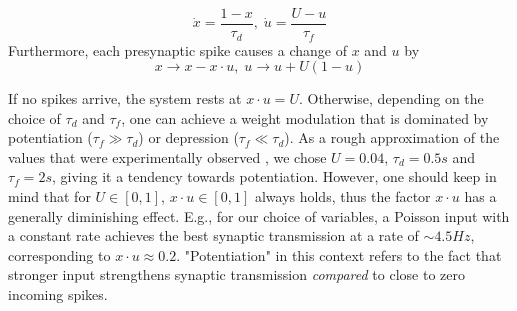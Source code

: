 \documentclass[10pt,a4paper]{article}
\begin{document}
\begin{equation}
\dot{x} = \frac{1-x}{\tau_d},\; \dot{u} = \frac{U-u}{\tau_f}
\label{STP_dynamics1}
\end{equation}
Furthermore, each presynaptic spike causes a change of $x$ and $u$ by
\begin{equation}
x \rightarrow x - x\cdot u,\; u \rightarrow u + U(1-u)
\label{STP_dynamics2}
\end{equation}

If no spikes arrive, the system rests at $x\cdot u = U$. Otherwise, depending on the choice of $\tau_d$ and $\tau_f$, one can achieve a weight modulation that is dominated by potentiation ($\tau_f \gg \tau_d$) or depression ($\tau_f \ll \tau_d$). As a rough approximation of the values that were experimentally observed \cite{Markram_STP}, we chose $U=0.04$, $\tau_d = 0.5s$ and $\tau_f = 2s$, giving it a tendency towards potentiation. However, one should keep in mind that for $U\in [0,1]$, $x\cdot u \in [0,1]$ always holds, thus the factor $x\cdot u$ has a generally diminishing effect. E.g., for our choice of variables, a Poisson input with a constant rate achieves the best synaptic transmission at a rate of $\sim 4.5 Hz$, corresponding to $x\cdot u \approx 0.2$. "Potentiation" in this context refers to the fact that stronger input strengthens synaptic transmission \emph{compared} to close to zero incoming spikes.

\newpage
\end{document}
